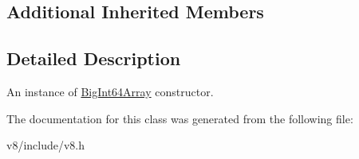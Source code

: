 \subsection*{Additional Inherited Members}


\subsection{Detailed Description}
An instance of \mbox{\hyperlink{classv8_1_1BigInt64Array}{Big\+Int64\+Array}} constructor. 

The documentation for this class was generated from the following file\+:\begin{DoxyCompactItemize}
\item 
v8/include/v8.\+h\end{DoxyCompactItemize}
